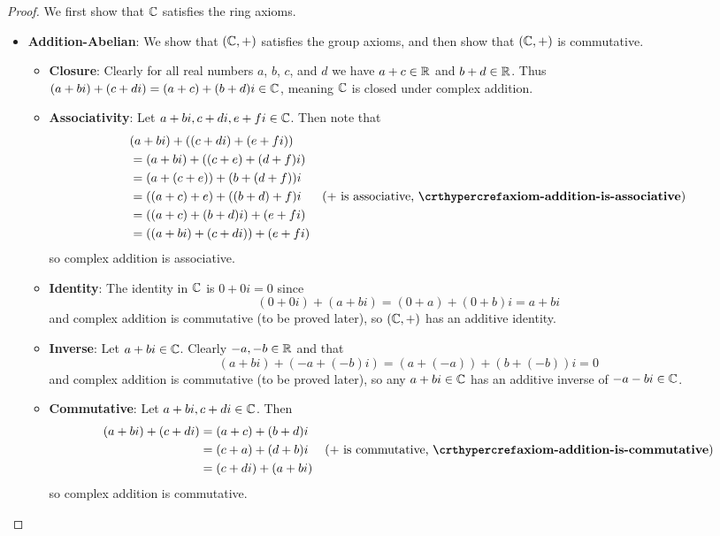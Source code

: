 \begin{proof}
    We first show that $\mathbb{C}$ satisfies the ring axioms.
    \begin{itemize}
        \item \textbf{Addition-Abelian}: We show that $(\mathbb{C}, +)$ satisfies the group axioms, and then show that $(\mathbb{C}, +)$ is commutative.
        \begin{itemize}
            \item \textbf{Closure}: Clearly for all real numbers $a$, $b$, $c$, and $d$ we have $a + c \in \mathbb{R}$ and $b+d \in \mathbb{R}$. Thus $(a+bi) + (c+di) = (a+c) + (b+d)i \in \mathbb{C}$, meaning $\mathbb{C}$ is closed under complex addition.

            \item \textbf{Associativity}: Let $a+bi, c+di, e+fi \in \mathbb{C}$. Then note that
            \begin{align*}
                &(a+bi) + ((c+di) + (e+fi))\\
                &= (a+bi) + ((c+e) + (d+f)i)\\
                &= (a+(c+e)) + (b+(d+f))i\\
                &= ((a+c)+e) + ((b+d)+f)i & (+ \text{ is associative, }\myref{axiom-addition-is-associative})\\
                &= ((a+c) + (b+d)i) + (e+fi)\\
                &= ((a+bi) + (c+di)) + (e+fi)
            \end{align*}
            so complex addition is associative.

            \item \textbf{Identity}: The identity in $\mathbb{C}$ is $0 + 0i = 0$ since
            \[
                (0+0i) + (a+bi) = (0+a) + (0+b)i = a+bi
            \]
            and complex addition is commutative (to be proved later), so $(\mathbb{C},+)$ has an additive identity.

            \item \textbf{Inverse}: Let $a+bi \in \mathbb{C}$. Clearly $-a, -b \in \mathbb{R}$ and that
            \[
                (a+bi) + (-a+(-b)i)= (a+(-a)) + (b+(-b))i = 0
            \]
            and complex addition is commutative (to be proved later), so any $a+bi \in \mathbb{C}$ has an additive inverse of $-a-bi \in \mathbb{C}$.

            \item \textbf{Commutative}: Let $a+bi, c+di \in \mathbb{C}$. Then
            \begin{align*}
                (a+bi) + (c+di) &= (a+c) + (b+d)i\\
                &= (c+a) + (d+b)i & (+\text{ is commutative, } \myref{axiom-addition-is-commutative})\\
                &= (c+di) + (a+bi)
            \end{align*}
            so complex addition is commutative.
        \end{itemize}


\end{itemize}
\end{proof}
